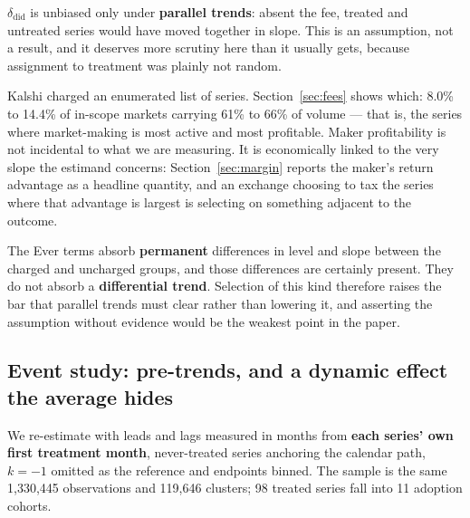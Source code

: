 \documentclass[preprint,12pt,authoryear]{elsarticle}
\begin{document}
$\delta_{\mathrm{did}}$ is unbiased only under \textbf{parallel trends}: absent
the fee, treated and untreated series would have moved together in slope. This
is an assumption, not a result, and it deserves more scrutiny here than it
usually gets, because assignment to treatment was plainly not random.

Kalshi charged an enumerated list of series. Section~\ref{sec:fees} shows which:
8.0\% to 14.4\% of in-scope markets carrying 61\% to 66\% of volume --- that is,
the series where market-making is most active and most profitable. Maker
profitability is not incidental to what we are measuring. It is economically
linked to the very slope the estimand concerns:
Section~\ref{sec:margin} reports the maker's return advantage as a headline
quantity, and an exchange choosing to tax the series where that advantage is
largest is selecting on something adjacent to the outcome.

The \textrm{Ever} terms absorb \textbf{permanent} differences in level and slope
between the charged and uncharged groups, and those differences are certainly
present. They do not absorb a \textbf{differential trend}. Selection of this
kind therefore raises the bar that parallel trends must clear rather than
lowering it, and asserting the assumption without evidence would be the weakest
point in the paper.

\subsection{Event study: pre-trends, and a dynamic effect the average
hides}\label{sec:eventstudy}

We re-estimate with leads and lags measured in months from \textbf{each series'
own first treatment month}, never-treated series anchoring the calendar path,
$k=-1$ omitted as the reference and endpoints binned. The sample is the same
1,330,445 observations and 119,646 clusters; 98 treated series fall into 11
adoption cohorts.
\end{document}
